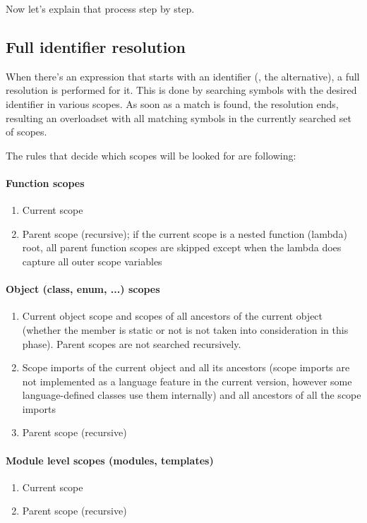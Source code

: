 Now let's explain that process step by step.

\subsection{Full identifier resolution} \label{fullIdentifierResolution}
When there's an expression that starts with an identifier (, the  alternative), a full resolution is performed for it. This is done by searching symbols with the desired identifier in various scopes. As soon as a match is found, the resolution ends, resulting an overloadset with all matching symbols in the currently searched set of scopes.

The rules that decide which scopes will be looked for are following:

\paragraph{Function scopes}
\begin{enumerate}
	\item Current scope
	\item Parent scope (recursive); if the current scope is a nested function (lambda) root, all parent function scopes are skipped except when the lambda does capture all outer scope variables
\end{enumerate}

\paragraph{Object (class, enum, ...) scopes}
\begin{enumerate}
	\item Current object scope and scopes of all ancestors of the current object (whether the member is static or not is not taken into consideration in this phase). Parent scopes are not searched recursively.
	\item Scope imports of the current object and all its ancestors (scope imports are not implemented as a language feature in the current version, however some language-defined classes use them internally) and all ancestors of all the scope imports
	\item Parent scope (recursive)
\end{enumerate}

\paragraph{Module level scopes (modules, templates)}
\begin{enumerate}
	\item Current scope
	\item Parent scope (recursive)
\end{enumerate}

